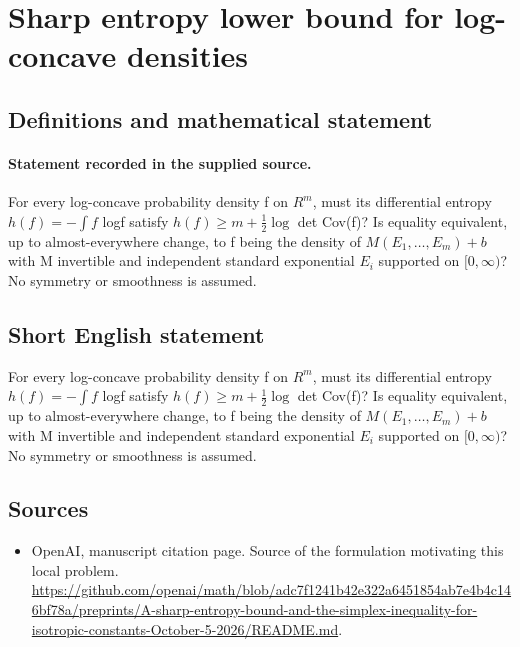 \documentclass[11pt]{article}
\begin{document}
\section*{Sharp entropy lower bound for log-concave densities}\label{statement}
\subsection{Definitions and mathematical statement}
\paragraph{Statement recorded in the supplied source.}
For every log-concave probability density f on $R^{m}$, must its differential entropy $h(f)=-\int f$ logf satisfy $h(f)\geq m+\tfrac12 \log $ det Cov(f)? Is equality equivalent, up to almost-everywhere change, to f being the density of $M(E_{1},\dots ,E_m)+b$ with M invertible and independent standard exponential $E_i$ supported on $[0,\infty )$? No symmetry or smoothness is assumed.
\subsection{Short English statement}
For every log-concave probability density f on $R^{m}$, must its differential entropy $h(f)=-\int f$ logf satisfy $h(f)\geq m+\tfrac12 \log $ det Cov(f)? Is equality equivalent, up to almost-everywhere change, to f being the density of $M(E_{1},\dots ,E_m)+b$ with M invertible and independent standard exponential $E_i$ supported on $[0,\infty )$? No symmetry or smoothness is assumed.
\subsection{Sources}
\begin{itemize}
\item[S1] OpenAI, manuscript citation page. Source of the formulation motivating this local problem.
\url{https://github.com/openai/math/blob/adc7f1241b42e322a6451854ab7e4b4c146bf78a/preprints/A-sharp-entropy-bound-and-the-simplex-inequality-for-isotropic-constants-October-5-2026/README.md}.
\end{itemize}
\end{document}
